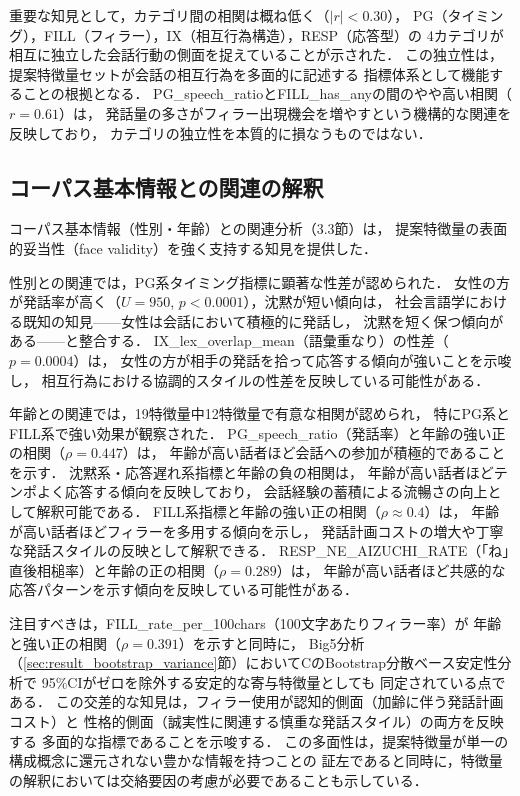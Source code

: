 \documentclass[dvipdfmx,11pt,a4paper]{bxjsarticle}
\begin{document}
重要な知見として，カテゴリ間の相関は概ね低く（$|r| < 0.30$），
PG（タイミング），FILL（フィラー），IX（相互行為構造），RESP（応答型）の
4カテゴリが相互に独立した会話行動の側面を捉えていることが示された．
この独立性は，提案特徴量セットが会話の相互行為を多面的に記述する
指標体系として機能することの根拠となる．
PG\_speech\_ratioとFILL\_has\_anyの間のやや高い相関（$r = 0.61$）は，
発話量の多さがフィラー出現機会を増やすという機構的な関連を反映しており，
カテゴリの独立性を本質的に損なうものではない．

\subsection{コーパス基本情報との関連の解釈}

コーパス基本情報（性別・年齢）との関連分析（3.3節）は，
提案特徴量の表面的妥当性（face validity）を強く支持する知見を提供した．

性別との関連では，PG系タイミング指標に顕著な性差が認められた．
女性の方が発話率が高く（$U = 950$, $p < 0.0001$），沈黙が短い傾向は，
社会言語学における既知の知見——女性は会話において積極的に発話し，
沈黙を短く保つ傾向がある——と整合する．
IX\_lex\_overlap\_mean（語彙重なり）の性差（$p = 0.0004$）は，
女性の方が相手の発話を拾って応答する傾向が強いことを示唆し，
相互行為における協調的スタイルの性差を反映している可能性がある．

年齢との関連では，19特徴量中12特徴量で有意な相関が認められ，
特にPG系とFILL系で強い効果が観察された．
PG\_speech\_ratio（発話率）と年齢の強い正の相関（$\rho = 0.447$）は，
年齢が高い話者ほど会話への参加が積極的であることを示す．
沈黙系・応答遅れ系指標と年齢の負の相関は，
年齢が高い話者ほどテンポよく応答する傾向を反映しており，
会話経験の蓄積による流暢さの向上として解釈可能である．
FILL系指標と年齢の強い正の相関（$\rho \approx 0.4$）は，
年齢が高い話者ほどフィラーを多用する傾向を示し，
発話計画コストの増大や丁寧な発話スタイルの反映として解釈できる．
RESP\_NE\_AIZUCHI\_RATE（「ね」直後相槌率）と年齢の正の相関（$\rho = 0.289$）は，
年齢が高い話者ほど共感的な応答パターンを示す傾向を反映している可能性がある．

注目すべきは，FILL\_rate\_per\_100chars（100文字あたりフィラー率）が
年齢と強い正の相関（$\rho = 0.391$）を示すと同時に，
Big5分析（\ref{sec:result_bootstrap_variance}節）においてCのBootstrap分散ベース安定性分析で
95\%CIがゼロを除外する安定的な寄与特徴量としても
同定されている点である．
この交差的な知見は，フィラー使用が認知的側面（加齢に伴う発話計画コスト）と
性格的側面（誠実性に関連する慎重な発話スタイル）の両方を反映する
多面的な指標であることを示唆する．
この多面性は，提案特徴量が単一の構成概念に還元されない豊かな情報を持つことの
証左であると同時に，特徴量の解釈においては交絡要因の考慮が必要であることも示している．
\end{document}
